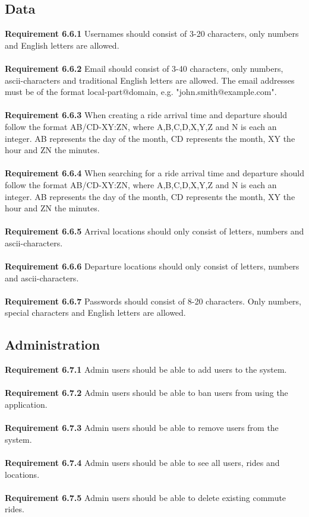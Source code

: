 \documentclass{article}
\begin{document}
\subsection{Data} \label{section:data}
\textbf{Requirement 6.6.1} Usernames should consist of 3-20 characters, only numbers and English letters are allowed. 
\mbox{}\\
\\
\textbf{Requirement 6.6.2} Email should consist of 3-40 characters, only numbers, ascii-characters and traditional English letters are allowed. The email addresses must be of the format local-part@domain, e.g. "john.smith@example.com".
\mbox{}\\
\\
\textbf{Requirement 6.6.3} When creating a ride  arrival time and departure should follow the format AB/CD-XY:ZN, where A,B,C,D,X,Y,Z and N is each an integer. AB represents the day of the month, CD represents the month, XY the hour and ZN the minutes. 
\\ \\
\textbf{Requirement 6.6.4}  When searching for a ride  arrival time and departure should follow the format AB/CD-XY:ZN, where A,B,C,D,X,Y,Z and N is each an integer. AB represents the day of the month, CD represents the month, XY the hour and ZN the minutes.
\\ \\
\textbf{Requirement 6.6.5} Arrival locations should only consist of letters, numbers and ascii-characters.
\\ \\
\textbf{Requirement 6.6.6} Departure locations should only consist of letters, numbers and ascii-characters.
\\ \\
\textbf{Requirement 6.6.7} Passwords should consist of 8-20 characters. Only numbers, special characters and English letters are allowed.


\subsection{Administration}
\textbf{Requirement 6.7.1} Admin users should be able to add users to the system.
\\ \\
\textbf{Requirement 6.7.2} Admin users should be able to ban users from using the application.
\\ \\
\textbf{Requirement 6.7.3} Admin users should be able to remove users from the system.
\\ \\
\textbf{Requirement 6.7.4} Admin users should be able to see all users, rides and locations.
\\ \\
\textbf{Requirement 6.7.5} Admin users should be able to delete existing commute rides.
\end{document}
